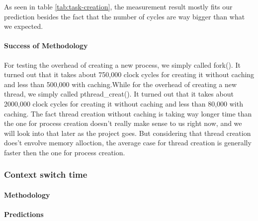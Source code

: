 As seen in table \ref{tab:task-creation}, the measurement result mostly fits our prediction besides the fact that the number of cycles are way bigger than what we expected.
\paragraph{Success of Methodology}
For testing the overhead of creating a new process, we simply called fork(). It turned out that it takes about 750,000 clock cycles for creating it without caching and less than 500,000 with caching.While for the overhead of creating a new thread, we simply called pthread\_creat(). It turned out that it takes about 2000,000 clock cycles for creating it without caching and less than 80,000 with caching.
The fact thread creation without caching is taking way longer time than the one for process creation doesn't really make sense to us right now, and we will look into that later as the project goes. But considering that thread creation does't envolve memory alloction, the average case for thread creation is generally faster then the one for process creation.


\subsubsection{Context switch time}
\paragraph{Methodology}
\paragraph{Predictions}
